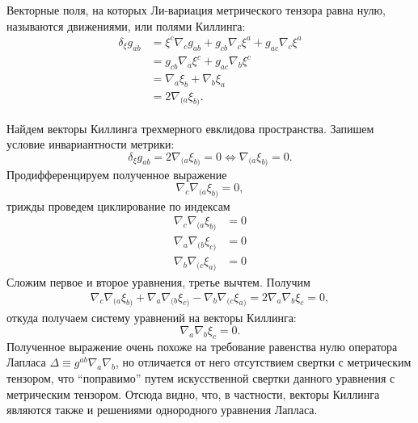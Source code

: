 \documentclass[12pt,a4paper]{article}
\begin{document}
        Векторные поля, на которых Ли-вариация метрического тензора равна нулю, называются движениями, или полями Киллинга:
        \begin{equation}\begin{aligned}
            \delta_\xi g_{ab}
                &= \xi^c \nabla_c g_{ab} + g_{cb} \nabla_{c} \xi^a + g_{ac} \nabla_{c} \xi^a \\
                &= g_{cb} \nabla_{a} \xi^c + g_{ac} \nabla_{b} \xi^c \\
                &= \nabla_{a} \xi_b + \nabla_{b} \xi_a \\
                &= 2 \nabla_{(a} \xi_{b)}.
        \end{aligned}\end{equation}

        Найдем векторы Киллинга трехмерного евклидова пространства. Запишем условие инвариантности метрики:
        \begin{equation}
            \delta_\xi g_{ab}
                = 2 \nabla_{(a} \xi_{b)}
                = 0
                \Leftrightarrow \nabla_{(a} \xi_{b)} = 0.
        \end{equation}
        Продифференцируем полученное выражение
        \begin{equation}
            \nabla_c \nabla_{(a} \xi_{b)} = 0,
        \end{equation}
        трижды проведем циклирование по индексам
        \begin{equation}\begin{aligned}
            \nabla_c \nabla_{(a} \xi_{b)} &= 0 \\
            \nabla_a \nabla_{(b} \xi_{c)} &= 0 \\
            \nabla_b \nabla_{(c} \xi_{a)} &= 0
        \end{aligned}\end{equation}
        Сложим первое и второе уравнения, третье вычтем. Получим
        \begin{equation}\begin{aligned}
            \nabla_c \nabla_{(a} \xi_{b)} +
            \nabla_a \nabla_{(b} \xi_{c)} -
            \nabla_b \nabla_{(c} \xi_{a)} =
            2 \nabla_a \nabla_b \xi_c     = 0,
        \end{aligned}\end{equation}
        откуда получаем систему уравнений на векторы Киллинга:
        \begin{equation}
            \nabla_a \nabla_b \xi_c = 0.
        \end{equation}
        Полученное выражение очень похоже на требование равенства нулю оператора Лапласа $\Delta \equiv g^{ab} \nabla_a \nabla_b$, но отличается от него отсутствием свертки с метрическим тензором, что \enquote{поправимо} путем искусственной свертки данного уравнения с метрическим тензором. Отсюда видно, что, в частности, векторы Киллинга являются также и решениями однородного уравнения Лапласа.
\end{document}
